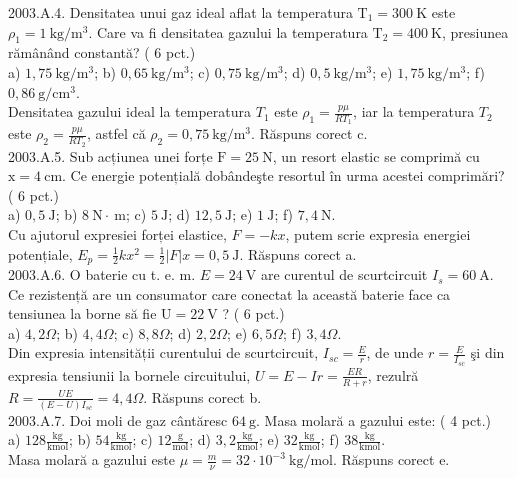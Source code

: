 2003.A.4. Densitatea unui gaz ideal aflat la temperatura $\mathrm{T}_{1}=300 \mathrm{~K}$ este $\rho_{1}=1 \mathrm{~kg} / \mathrm{m}^{3}$. Care va fi densitatea gazului la temperatura $\mathrm{T}_{2}=400 \mathrm{~K}$, presiunea rămânând constantă? ( 6 pct.)\\ a) $1,75 \mathrm{~kg} / \mathrm{m}^{3}$; b) $0,65 \mathrm{~kg} / \mathrm{m}^{3}$; c) $0,75 \mathrm{~kg} / \mathrm{m}^{3}$; d) $0,5 \mathrm{~kg} / \mathrm{m}^{3}$; e) $1,75 \mathrm{~kg} / \mathrm{m}^{3}$; f) $0,86 \mathrm{~g} / \mathrm{cm}^{3}$.\\ Densitatea gazului ideal la temperatura $T_{1}$ este $\rho_{1}=\frac{p \mu}{R T_{1}}$, iar la temperatura $T_{2}$ este $\rho_{2}=\frac{p \mu}{R T_{2}}$, astfel că $\rho_{2}=0,75 \mathrm{~kg} / \mathrm{m}^{3}$. Răspuns corect c.\\

2003.A.5. Sub acțiunea unei forțe $\mathrm{F}=25 \mathrm{~N}$, un resort elastic se comprimă cu $\mathrm{x}=4 \mathrm{~cm}$. Ce energie potențială dobândeşte resortul în urma acestei comprimări? ( 6 pct.)\\ a) $0,5 \mathrm{~J}$; b) $8 \mathrm{~N} \cdot \mathrm{~m}$; c) $5 \mathrm{~J}$; d) $12,5 \mathrm{~J}$; e) $1 \mathrm{~J}$; f) $7,4 \mathrm{~N}$.\\ Cu ajutorul expresiei forței elastice, $F=-k x$, putem scrie expresia energiei potențiale, $E_{p}=\frac{1}{2} k x^{2}=\frac{1}{2}|F| x=0,5 \mathrm{~J}$. Răspuns corect a.\\

2003.A.6. O baterie cu t. e. m. $E=24 \mathrm{~V}$ are curentul de scurtcircuit $I_{s}=60 \mathrm{~A}$. Ce rezistență are un consumator care conectat la această baterie face ca tensiunea la borne să fie $\mathrm{U}=22 \mathrm{~V}$ ? ( 6 pct.)\\ a) $4,2 \Omega$; b) $4,4 \Omega$; c) $8,8 \Omega$; d) $2,2 \Omega$; e) $6,5 \Omega$; f) $3,4 \Omega$.\\ Din expresia intensității curentului de scurtcircuit, $I_{sc}=\frac{E}{r}$, de unde $r=\frac{E}{I_{sc}}$ şi din expresia tensiunii la bornele circuitului, $U=E-I r=\frac{E R}{R+r}$, rezulră $R=\frac{U E}{(E-U) I_{sc}}=4,4 \Omega$. Răspuns corect b.\\

2003.A.7. Doi moli de gaz cântăresc $64 \mathrm{~g}$. Masa molară a gazului este: ( 4 pct.)\\ a) $128 \frac{\mathrm{kg}}{\mathrm{kmol}}$; b) $54 \frac{\mathrm{kg}}{\mathrm{kmol}}$; c) $12 \frac{\mathrm{g}}{\mathrm{mol}}$; d) $3,2 \frac{\mathrm{kg}}{\mathrm{kmol}}$; e) $32 \frac{\mathrm{kg}}{\mathrm{kmol}}$; f) $38 \frac{\mathrm{kg}}{\mathrm{kmol}}$.\\ Masa molară a gazului este $\mu=\frac{m}{\nu}=32 \cdot 10^{-3} \mathrm{~kg} / \mathrm{mol}$. Răspuns corect e.\\

